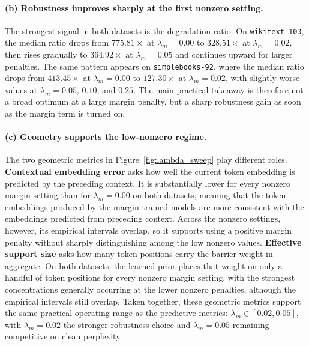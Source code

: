 \documentclass[11pt]{article}
\begin{document}
\paragraph{(b) Robustness improves sharply at the first nonzero setting.}
The strongest signal in both datasets is the degradation ratio. On
\texttt{wikitext-103}, the median ratio drops from $775.81{\times}$ at
$\lambda_m{=}0.00$ to $328.51{\times}$ at $\lambda_m{=}0.02$, then rises
gradually to $364.92{\times}$ at $\lambda_m{=}0.05$ and continues upward for
larger penalties. The same pattern appears on \texttt{simplebooks-92}, where
the median ratio drops from $413.45{\times}$ at $\lambda_m{=}0.00$ to
$127.30{\times}$ at $\lambda_m{=}0.02$, with slightly worse values at
$\lambda_m{=}0.05$, $0.10$, and $0.25$. The main practical takeaway is
therefore not a broad optimum at a large margin penalty, but a sharp robustness gain
as soon as the margin term is turned on.

\paragraph{(c) Geometry supports the low-nonzero regime.}
The two geometric metrics in Figure~\ref{fig:lambda_sweep} play different
roles. \textbf{Contextual embedding error} asks how well the current token
embedding is predicted by the preceding context. It is substantially lower for every
nonzero margin setting than for $\lambda_m{=}0.00$ on both datasets, meaning
that the token embeddings produced by the margin-trained models are more
consistent with the embeddings predicted from preceding context.
Across the nonzero settings, however, its empirical intervals overlap, so it
supports using a positive margin penalty without sharply distinguishing among
the low nonzero values. \textbf{Effective support size} asks how many token
positions carry the barrier weight in aggregate. On both datasets, the learned
prior places that weight on only a handful of token positions for every
nonzero margin setting, with the strongest concentrations generally occurring
at the lower nonzero penalties, although the empirical intervals still
overlap. Taken together, these geometric metrics
support the same practical operating range as the predictive metrics:
$\lambda_m \in [0.02, 0.05]$, with $\lambda_m{=}0.02$ the stronger robustness
choice and $\lambda_m{=}0.05$ remaining competitive on clean perplexity.
\end{document}
